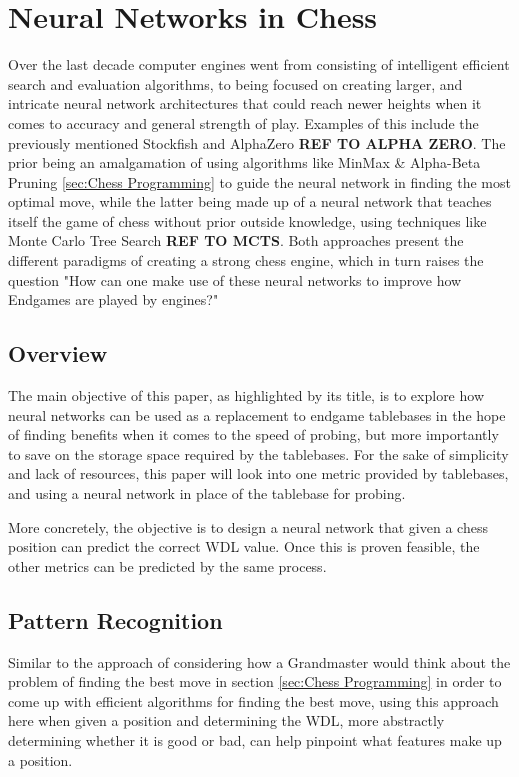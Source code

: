 \section{Neural Networks in Chess}
\label{sec:NeuralNets}

Over the last decade computer engines went from consisting of intelligent efficient search and evaluation algorithms, to being focused on creating larger, and intricate neural network architectures that could reach newer heights when it comes to accuracy and general strength of play. Examples of this include the previously mentioned Stockfish \cite{stockfish2024} and AlphaZero \textbf{REF TO ALPHA ZERO}. The prior being an amalgamation of using algorithms like MinMax \& Alpha-Beta Pruning \ref{sec:Chess Programming} to guide the neural network in finding the most optimal move, while the latter being made up of a neural network that teaches itself the game of chess without prior outside knowledge, using techniques like Monte Carlo Tree Search \textbf{REF TO MCTS}. Both approaches present the different paradigms of creating a strong chess engine, which in turn raises the question "How can one make use of these neural networks to improve how Endgames are played by engines?"

\subsection{Overview}
The main objective of this paper, as highlighted by its title, is to explore how neural networks can be used as a replacement to endgame tablebases in the hope of finding benefits when it comes to the speed of probing, but more importantly to save on the storage space required by the tablebases. For the sake of simplicity and lack of resources, this paper will look into one metric provided by tablebases, and using a neural network in place of the tablebase for probing.

More concretely, the objective is to design a neural network that given a chess position can predict the correct WDL value. Once this is proven feasible, the other metrics can be predicted by the same process. 

\subsection{Pattern Recognition}
Similar to the approach of considering how a Grandmaster would think about the problem of finding the best move in section \ref{sec:Chess Programming} in order to come up with efficient algorithms for finding the best move, using this approach here when given a position and determining the WDL, more abstractly determining whether it is good or bad, can help pinpoint what features make up a position.

